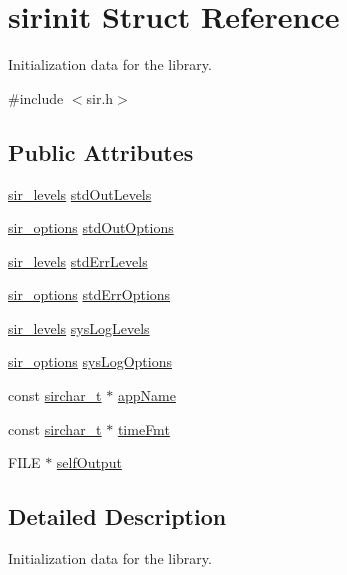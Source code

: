 \hypertarget{structsirinit}{}\section{sirinit Struct Reference}
\label{structsirinit}


Initialization data for the library.  




{\ttfamily \#include $<$sir.\+h$>$}

\subsection*{Public Attributes}
\begin{DoxyCompactItemize}
\item 
\hyperlink{sir_8h_a7ee5f2908abd2df9e89bcab0b6608edd}{sir\+\_\+levels} \hyperlink{structsirinit_aa93387a8401dbcd2c940455fada80e9b}{std\+Out\+Levels}
\item 
\hyperlink{sir_8h_a858fff8dae5b79ae8849a8021a53c18c}{sir\+\_\+options} \hyperlink{structsirinit_a32b2ce90a50bf2e08d5a6fbd04483863}{std\+Out\+Options}
\item 
\hyperlink{sir_8h_a7ee5f2908abd2df9e89bcab0b6608edd}{sir\+\_\+levels} \hyperlink{structsirinit_a532ad88eb2e9a0111a452c937fec7441}{std\+Err\+Levels}
\item 
\hyperlink{sir_8h_a858fff8dae5b79ae8849a8021a53c18c}{sir\+\_\+options} \hyperlink{structsirinit_a15720d258e5c8f8c7944dad05d8a4f63}{std\+Err\+Options}
\item 
\hyperlink{sir_8h_a7ee5f2908abd2df9e89bcab0b6608edd}{sir\+\_\+levels} \hyperlink{structsirinit_ab3499f342b50831ba3a39410dba38866}{sys\+Log\+Levels}
\item 
\hyperlink{sir_8h_a858fff8dae5b79ae8849a8021a53c18c}{sir\+\_\+options} \hyperlink{structsirinit_ab3340fe95410595d83b6d8337b7037a9}{sys\+Log\+Options}
\item 
const \hyperlink{sir_8h_a1d2f790e2dabc69c8a625f2ee5dc583a}{sirchar\+\_\+t} $\ast$ \hyperlink{structsirinit_aeb5ae1905f653b2ba48bc46230cfc0cc}{app\+Name}
\item 
const \hyperlink{sir_8h_a1d2f790e2dabc69c8a625f2ee5dc583a}{sirchar\+\_\+t} $\ast$ \hyperlink{structsirinit_a5f1cfe947c23692684183b871395de28}{time\+Fmt}
\item 
F\+I\+LE $\ast$ \hyperlink{structsirinit_a373d3dc5117db31c29be3651626ad87d}{self\+Output}
\end{DoxyCompactItemize}


\subsection{Detailed Description}
Initialization data for the library. 

